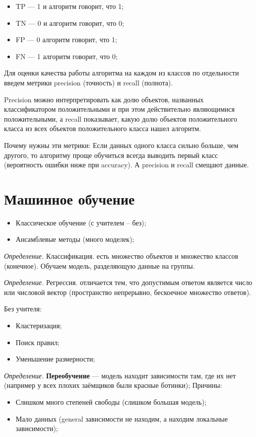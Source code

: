 \documentclass[a4paper,14pt]{article}
\begin{document}
\begin{itemize}
    \item TP --- 1 и алгоритм говорит, что 1;
    \item TN --- 0 и алгоритм говорит, что 0;
    \item FP --- 0 алгоритм говорит, что 1;
    \item FN --- 1 алгоритм говорит, что 0;
\end{itemize}
Для оценки качества работы алгоритма на каждом из классов по отдельности введем метрики precision (точность) и recall (полнота).

Precision можно интерпретировать как долю объектов, названных классификатором положительными и при этом действительно являющимися положительными, а recall показывает, какую долю объектов положительного класса из всех объектов положительного класса нашел алгоритм.

Почему нужны эти метрики: Если данных одного класса сильно больше, чем другого, то алгоритму проще обучиться всегда выводить первый класс (вероятность ошибки ниже при accuracy). А precision и recall смещают данные.

\section{Машинное обучение}
\begin{itemize}
    \item Классическое обучение (с учителем -- без);
    \item Ансамблевые методы (много моделек);
\end{itemize}

{\it Определение.}  Классификация. есть множество объектов и множество классов (конечное). Обучаем модель, разделяющую данные на группы.

{\it Определение.}  Регрессия. отличается тем, что допустимым ответом является число или числовой вектор (пространство непрерывно, бескоечное множество ответов).

Без учителя:
\begin{itemize}
    \item Кластеризация;
    \item Поиск правил;
    \item Уменьшение размерности;
\end{itemize}


{\it Определение.} {\bf Переобучение } --- модель находит зависимости там, где их нет (например у всех плохих заёмщиков были красные ботинки);
Причины:
\begin{itemize}
    \item Слишком много степеней свободы (слишком большая модель);
    \item Мало данных (general зависимости не находим, а находим локальные зависимости);
\end{itemize}
\end{document}
